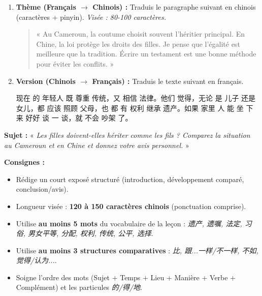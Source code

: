 \documentclass[11pt]{article}
\begin{document}
\begin{exercice}
\begin{enumerate}
    \item \textbf{Thème (Français $\to$ Chinois) :} Traduis le paragraphe suivant en chinois (caractères + pinyin). \emph{Visée : 80-100 caractères.}
    \begin{quote}
    « Au Cameroun, la coutume choisit souvent l'héritier principal. En Chine, la loi protège les droits des filles. Je pense que l'égalité est meilleure que la tradition. Écrire un testament est une bonne méthode pour éviter les conflits. »
    \end{quote}
    \item \textbf{Version (Chinois $\to$ Français) :} Traduis le texte suivant en français.
    \begin{textebox}
    现在 的 年轻人 既 尊重 传统，又 相信 法律。他们 觉得，无论 是 儿子 还是 女儿，都 应该 照顾 父母，也 都 有 权利 继承 遗产。如果 家里 人 能 坐 下来 好好 谈 一 谈，就 不会 吵架 了。
    \end{textebox}
\end{enumerate}
\end{exercice}

\begin{exercice}
\textbf{Sujet :} « \emph{Les filles doivent-elles hériter comme les fils ? Comparez la situation au Cameroun et en Chine et donnez votre avis personnel.} »

\textbf{Consignes :}
\begin{itemize}
    \item Rédige un court exposé structuré (introduction, développement comparé, conclusion/avis).
    \item Longueur visée : \textbf{120 à 150 caractères chinois} (ponctuation comprise).
    \item Utilise \textbf{au moins 5 mots} du vocabulaire de la leçon : \emph{遗产, 遗嘱, 法定, 习俗, 男女平等, 分配, 权利, 传统, 公平, 选择}.
    \item Utilise \textbf{au moins 3 structures comparatives} : \emph{比, 跟...一样/不一样, 不如, 觉得/认为...}.
    \item Soigne l'ordre des mots (Sujet + Temps + Lieu + Manière + Verbe + Complément) et les particules \emph{的/得/地}.
\end{itemize}

\begin{textebox}
\begin{center}
\begin{tabular}{|p{0.9\linewidth}|}
\hline
\vspace{6cm} \\
\hline
\end{tabular}
\end{center}
\end{textebox}
\end{exercice}
\end{document}
